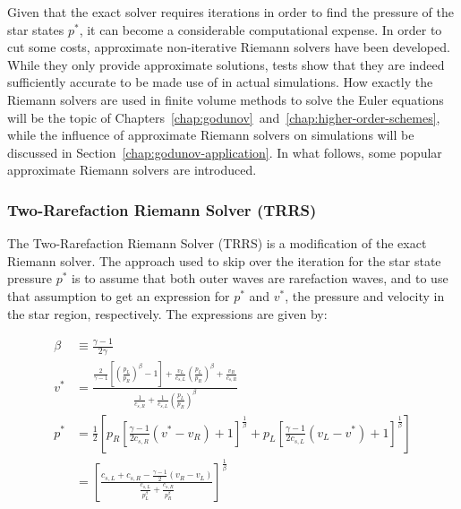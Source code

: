 Given that the exact solver requires iterations in order to find the pressure of the star states
$p^*$, it can become a considerable computational expense. In order to cut some costs, approximate
non-iterative Riemann solvers have been developed. While they only provide approximate solutions,
tests show that they are indeed sufficiently accurate to be made use of in actual simulations. How
exactly the Riemann solvers are used in finite volume methods to solve the Euler equations will be
the topic of Chapters~\ref{chap:godunov}~and~\ref{chap:higher-order-schemes}, while the influence
of approximate Riemann solvers on simulations will be discussed in
Section~\ref{chap:godunov-application}. In what follows, some popular approximate Riemann solvers
are introduced.







\subsubsection{Two-Rarefaction Riemann Solver (TRRS)}\label{chap:riemann-trrs}

The Two-Rarefaction Riemann Solver (TRRS) is a modification of the exact Riemann solver. The
approach used to skip over the iteration for the star state pressure $p^*$ is to assume that both
outer waves are rarefaction waves, and to use that assumption to get an expression for $p^*$ and
$v^*$, the pressure and velocity in the star region, respectively. The expressions are given by:

\begin{align}
	\beta &\equiv
		\frac{\gamma - 1}{2 \gamma} \\
	v^* &=
		\frac{
			\frac{2}{\gamma - 1} \left[\left(\frac{p_L}{p_R} \right) ^ \beta - 1\right]+
\frac{v_L}{c_{s,L}} \left(\frac{p_L}{p_R} \right) ^ \beta  + \frac{v_R}{c_{s,R}}
		}{
			\frac{1}{c_{s,R}} + \frac{1}{c_{s,L}}\left(\frac{p_L}{p_R} \right) ^ \beta
		} \\
	p^* &=
		\frac{1}{2} \left[
			p_R \left[ \frac{\gamma - 1}{2 c_{s,R}} (v^* - v_R) + 1 \right] ^ \frac{1}{\beta} +
			p_L \left[ \frac{\gamma - 1}{2 c_{s,L}} (v_L - v^*) + 1 \right] ^ \frac{1}{\beta}
		\right] \label{eq:pstar-trrs} \\
		&=
		\left[
			\frac{ c_{s,L} + c_{s,R} - \frac{\gamma - 1}{2} (v_R - v_L)}{\frac{c_{s,L}}{p_L^\beta}
+         \frac{c_{s,R}}{p_R^\beta}}
		\right] ^ \frac{1}{\beta}
\end{align}


